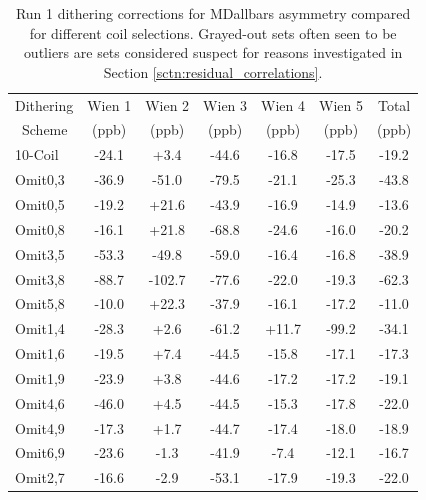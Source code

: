 \begin{table}[!h]

\caption{Run 1 dithering corrections for MDallbars asymmetry compared for different coil selections. Grayed-out sets often seen to be outliers are sets considered suspect for reasons investigated in Section \ref{sctn:residual_correlations}.}
\begin{center}
\begin{tabular}[h]{|l||c|c|c|c|c||c|}\hline
Dithering& Wien 1& Wien 2& Wien 3& Wien 4& Wien 5& Total\\
~Scheme&(ppb)&(ppb)&(ppb)&(ppb)&(ppb)&(ppb)\\\hline\hline
10-Coil& -24.1& +3.4& -44.6& -16.8& -17.5& -19.2\\\hline
{\color{Gray}Omit0,3}&{\color{Gray} -36.9}&{\color{Gray} -51.0}&{\color{Gray} -79.5}&{\color{Gray} -21.1}&{\color{Gray} -25.3}&{\color{Gray} -43.8}\\\hline
Omit0,5& -19.2& +21.6& -43.9& -16.9& -14.9& -13.6\\\hline
{\color{Gray}Omit0,8}&{\color{Gray} -16.1}&{\color{Gray} +21.8}&{\color{Gray} -68.8}&{\color{Gray} -24.6}&{\color{Gray} -16.0}&{\color{Gray} -20.2}\\\hline
{\color{Gray}Omit3,5}&{\color{Gray} -53.3}&{\color{Gray} -49.8}&{\color{Gray} -59.0}&{\color{Gray} -16.4}&{\color{Gray} -16.8}&{\color{Gray} -38.9}\\\hline
{\color{Gray}Omit3,8}&{\color{Gray} -88.7}&{\color{Gray} -102.7}&{\color{Gray} -77.6}&{\color{Gray} -22.0}&{\color{Gray} -19.3}&{\color{Gray} -62.3}\\\hline
{\color{Gray}Omit5,8}&{\color{Gray} -10.0}&{\color{Gray} +22.3}&{\color{Gray} -37.9}&{\color{Gray} -16.1}&{\color{Gray} -17.2}&{\color{Gray} -11.0}\\\hline
{\color{Gray}Omit1,4}&{\color{Gray} -28.3}&{\color{Gray} +2.6}&{\color{Gray} -61.2}&{\color{Gray} +11.7}&{\color{Gray} -99.2}&{\color{Gray} -34.1}\\\hline
Omit1,6& -19.5& +7.4& -44.5& -15.8& -17.1& -17.3\\\hline
Omit1,9& -23.9& +3.8& -44.6& -17.2& -17.2& -19.1\\\hline
Omit4,6& -46.0& +4.5& -44.5& -15.3& -17.8& -22.0\\\hline
Omit4,9& -17.3& +1.7& -44.7& -17.4& -18.0& -18.9\\\hline
Omit6,9& -23.6& -1.3& -41.9& -7.4& -12.1& -16.7\\\hline
Omit2,7& -16.6& -2.9& -53.1& -17.9& -19.3& -22.0\\\hline

\end{tabular}
\end{center}
\end{table}
